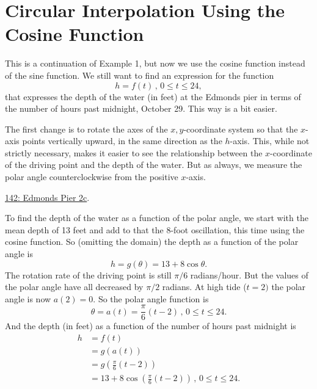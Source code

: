 \documentclass{ximera}
\begin{document}
\section{Circular Interpolation Using the Cosine Function}
\begin{example} \label{Ex:lfffme3f}
This is a continuation of Example 1, but now we use the cosine function instead of the sine function. We still want to find an expression for the function
\[
     h = f(t) \, , \, 0\leq t \leq 24,
\]
that expresses the depth of the water (in feet) at the Edmonds pier in terms of the number of hours past midnight, October 29. This way is a bit easier.

The first change is to rotate the axes of the $x,y$-coordinate system so that the $x$-axis points vertically upward, in the same direction as the $h$-axis. This, while not strictly necessary, makes it easier to see the relationship between the $x$-coordinate of the driving point and the depth of the water. But as always, we measure the polar angle counterclockwise from the positive $x$-axis.

\begin{onlineOnly}
    \begin{center}
\end{center}
\end{onlineOnly}

\href{https://www.desmos.com/calculator/caylccjijk}{142: Edmonds Pier 2c}.

To find the depth of the water as a function of the polar angle, we start with the mean depth of 13 feet and add to that the $8$-foot oscillation, this time using the cosine function. So (omitting the domain) the depth as a function of the polar angle is
\[
    h = g(\theta) = 13 + 8\cos\theta .
\]
The rotation rate of the driving point is still $\pi/6$ radians/hour. But the values of the polar angle have all decreased by $\pi/2$ radians. At high tide ($t=2)$ the polar angle is now $a(2) = 0$. So the polar angle function is
\[
    \theta = a(t) = \frac{\pi}{6} \left( t - 2 \right) \, , \, 0\leq t \leq 24.
\]  
And the depth (in feet) as a function of the number of hours past midnight is
\begin{align*}
     h &= f(t)  \\
         & = g(a(t)) \\
         &= g\left(\frac{\pi}{6} \left( t - 2 \right) \right)  \\
         &= 13 + 8\cos \left(  \frac{\pi}{6} \left( t - 2 \right) \right) \, , \, 0\leq t \leq 24.
\end{align*}

\end{example}
\end{document}
